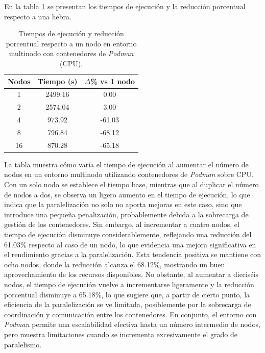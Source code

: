 En la tabla \ref{tab:multi-node_ubuntu_\textit{Podman}} se presentan los tiempos de ejecución y la reducción porcentual respecto a una hebra.

\begin{table}[ht]
    \centering
    \begin{tabular}{|c|c|c|}
        \hline
        \textbf{Nodos} & \textbf{Tiempo (s)} & \textbf{$\Delta$\% vs 1 nodo} \\
        \hline
        1              & 2499.16             & 0.00                          \\
        2              & 2574.04             & 3.00                          \\
        4              & 973.92              & -61.03                        \\
        8              & 796.84              & -68.12                        \\
        16             & 870.28              & -65.18                        \\
        \hline
    \end{tabular}
    \caption{Tiempos de ejecución y reducción porcentual respecto a un nodo en entorno multinodo con contenedores de \textit{Podman} (CPU).}
    \label{tab:multi-node_ubuntu_\textit{Podman}}
\end{table}

La tabla muestra cómo varía el tiempo de ejecución al aumentar el número de nodos en un entorno multinodo utilizando contenedores de \textit{Podman} sobre CPU. Con un solo nodo se establece el tiempo base, mientras que al duplicar el número de nodos a dos, se observa un ligero aumento en el tiempo de ejecución, lo que indica que la paralelización no solo no aporta mejoras en este caso, sino que introduce una pequeña penalización, probablemente debida a la sobrecarga de gestión de los contenedores. Sin embargo, al incrementar a cuatro nodos, el tiempo de ejecución disminuye considerablemente, reflejando una reducción del 61.03\% respecto al caso de un nodo, lo que evidencia una mejora significativa en el rendimiento gracias a la paralelización. Esta tendencia positiva se mantiene con ocho nodos, donde la reducción alcanza el 68.12\%, mostrando un buen aprovechamiento de los recursos disponibles. No obstante, al aumentar a dieciséis nodos, el tiempo de ejecución vuelve a incrementarse ligeramente y la reducción porcentual disminuye a 65.18\%, lo que sugiere que, a partir de cierto punto, la eficiencia de la paralelización se ve limitada, posiblemente por la sobrecarga de coordinación y comunicación entre los contenedores. En conjunto, el entorno con \textit{Podman} permite una escalabilidad efectiva hasta un número intermedio de nodos, pero muestra limitaciones cuando se incrementa excesivamente el grado de paralelismo.

